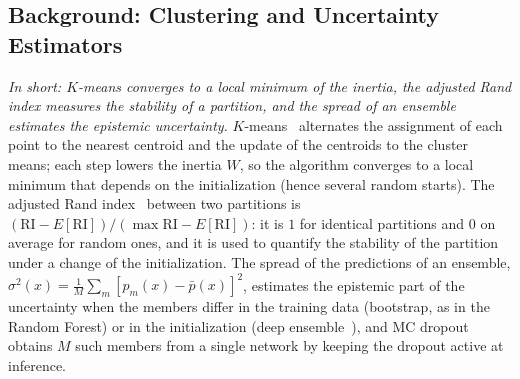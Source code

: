 \subsection{Background: Clustering and Uncertainty Estimators}
\emph{In short: $K$-means converges to a local minimum of the inertia, the adjusted Rand index measures the stability of a partition, and the spread of an ensemble estimates the epistemic uncertainty.}
$K$-means~\cite{lloyd_kmeans} alternates the assignment of each point to the nearest centroid and the update of the centroids to the cluster means; each step lowers the inertia $W$, so the algorithm converges to a local minimum that depends on the initialization (hence several random starts). The adjusted Rand index~\cite{hubert_ari} between two partitions is $(\mathrm{RI}-E[\mathrm{RI}])/(\max\mathrm{RI}-E[\mathrm{RI}])$: it is $1$ for identical partitions and $0$ on average for random ones, and it is used to quantify the stability of the partition under a change of the initialization. The spread of the predictions of an ensemble, $\sigma^2(x)=\frac1M\sum_m[p_m(x)-\bar p(x)]^2$, estimates the epistemic part of the uncertainty when the members differ in the training data (bootstrap, as in the Random Forest) or in the initialization (deep ensemble~\cite{deep_ensembles}), and MC dropout~\cite{gal_mcdropout} obtains $M$ such members from a single network by keeping the dropout active at inference.

